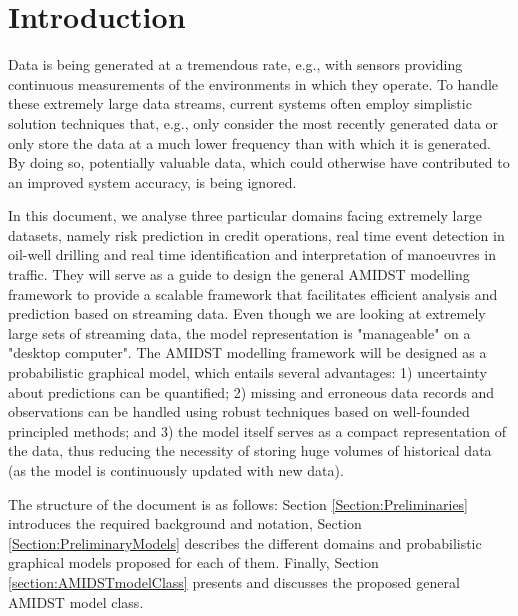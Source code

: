 \section{Introduction}

Data is being generated at a tremendous rate, e.g., with sensors providing continuous measurements of the environments in which they operate. To handle these extremely large data streams, current systems often employ simplistic solution techniques that, e.g., only consider the most recently generated data or only store the data at a much lower frequency than with which it is generated. By doing so, potentially valuable data, which could otherwise have contributed to an improved system accuracy, is being ignored. 

In this document, we analyse three particular domains facing extremely large datasets, namely risk prediction in credit operations, real time event detection in oil-well drilling and real time identification and interpretation of manoeuvres in traffic. They will serve as a guide to design the general AMIDST modelling framework to provide a scalable framework that facilitates efficient analysis and prediction based on streaming data. Even though we are looking at extremely large sets of streaming data, the model representation is "manageable" on a "desktop computer". The AMIDST modelling framework will be designed as a probabilistic graphical model, which entails several advantages: 1) uncertainty about predictions can be quantified; 2) missing and erroneous data records and observations can be handled using robust techniques based on well-founded principled methods; and 3) the model itself serves as a compact representation of the data, thus reducing the necessity of storing huge volumes of historical data (as the model is continuously updated with new data).

The structure of the document is as follows: Section \ref{Section:Preliminaries} introduces the required background and notation, Section \ref{Section:PreliminaryModels} describes the different domains and probabilistic graphical models proposed for each of them. Finally, Section \ref{section:AMIDSTmodelClass} presents and discusses the proposed general AMIDST model class.